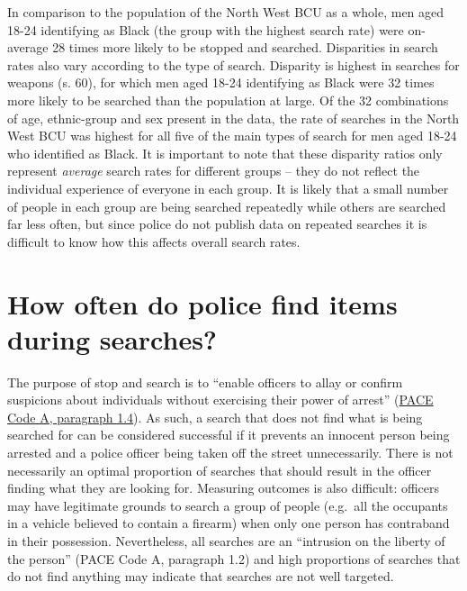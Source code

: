 \documentclass[
  a4paper,
  twoside, 11pt]{article}
\begin{document}
In comparison to the population of the North West BCU as a whole, men aged 18-24 identifying as Black (the group with the highest search rate) were on-average 28 times more likely to be stopped and searched. Disparities in search rates also vary according to the type of search. Disparity is highest in searches for weapons (s. 60), for which men aged 18-24 identifying as Black were 32 times more likely to be searched than the population at large. Of the 32 combinations of age, ethnic-group and sex present in the data, the rate of searches in the North West BCU was highest for all five of the main types of search for men aged 18-24 who identified as Black. It is important to note that these disparity ratios only represent \emph{average} search rates for different groups -- they do not reflect the individual experience of everyone in each group. It is likely that a small number of people in each group are being searched repeatedly while others are searched far less often, but since police do not publish data on repeated searches it is difficult to know how this affects overall search rates.

\hypertarget{how-often-do-police-find-items-during-searches}{%
\section{How often do police find items during searches?}\label{how-often-do-police-find-items-during-searches}}

The purpose of stop and search is to ``enable officers to allay or confirm suspicions about individuals without exercising their power of arrest'' (\href{https://www.gov.uk/guidance/police-and-criminal-evidence-act-1984-pace-codes-of-practice}{PACE Code A, paragraph 1.4}). As such, a search that does not find what is being searched for can be considered successful if it prevents an innocent person being arrested and a police officer being taken off the street unnecessarily. There is not necessarily an optimal proportion of searches that should result in the officer finding what they are looking for. Measuring outcomes is also difficult: officers may have legitimate grounds to search a group of people (e.g.~all the occupants in a vehicle believed to contain a firearm) when only one person has contraband in their possession. Nevertheless, all searches are an ``intrusion on the liberty of the person'' (PACE Code A, paragraph 1.2) and high proportions of searches that do not find anything may indicate that searches are not well targeted.
\end{document}
